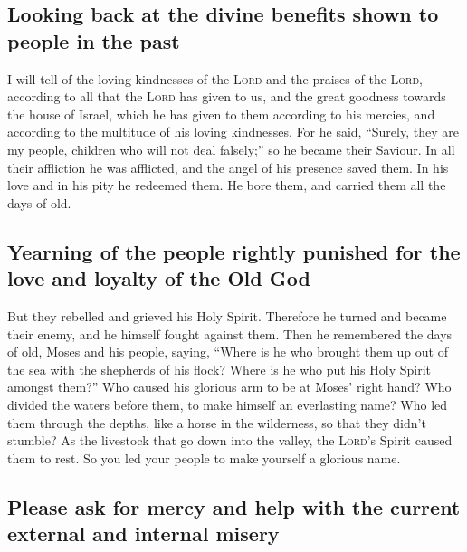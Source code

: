 \hypertarget{looking-back-at-the-divine-benefits-shown-to-people-in-the-past}{%
\subsection{Looking back at the divine benefits shown to people in the
past}\label{looking-back-at-the-divine-benefits-shown-to-people-in-the-past}}

 I will tell of the loving kindnesses of the \textsc{Lord}
and the praises of the \textsc{Lord}, according to all that the
\textsc{Lord} has given to us, and the great goodness towards the house
of Israel, which he has given to them according to his mercies, and
according to the multitude of his loving kindnesses.  For
he said, ``Surely, they are my people, children who will not deal
falsely;'' so he became their Saviour.  In all their
affliction he was afflicted, and the angel of his presence saved them.
In his love and in his pity he redeemed them. He bore them, and carried
them all the days of old.

\hypertarget{yearning-of-the-people-rightly-punished-for-the-love-and-loyalty-of-the-old-god}{%
\subsection{Yearning of the people rightly punished for the love and
loyalty of the Old
God}\label{yearning-of-the-people-rightly-punished-for-the-love-and-loyalty-of-the-old-god}}

 But they rebelled and grieved his Holy Spirit. Therefore
he turned and became their enemy, and he himself fought against them.
 Then he remembered the days of old, Moses and his
people, saying, ``Where is he who brought them up out of the sea with
the shepherds of his flock? Where is he who put his Holy Spirit amongst
them?''  Who caused his glorious arm to be at Moses'
right hand? Who divided the waters before them, to make himself an
everlasting name?  Who led them through the depths, like
a horse in the wilderness, so that they didn't stumble? 
As the livestock that go down into the valley, the \textsc{Lord}'s
Spirit caused them to rest. So you led your people to make yourself a
glorious name.

\hypertarget{please-ask-for-mercy-and-help-with-the-current-external-and-internal-misery}{%
\subsection{Please ask for mercy and help with the current external and
internal
misery}\label{please-ask-for-mercy-and-help-with-the-current-external-and-internal-misery}}

